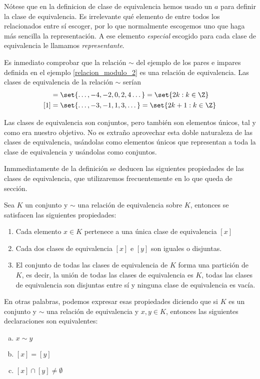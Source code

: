 \documentclass[../algebra_lineal.tex]{subfiles}
\begin{document}
\begin{remark}
    Nótese que en la definicion de clase de equivalencia hemos usado un $a$ para definir la clase de equivalencia. Es irrelevante qué elemento de entre todos los relacionados entre sí escoger, por lo que normalmente escogemos uno que haga más sencilla la representación. A ese elemento \textit{especial} escogido para cada clase de equivalencia le llamamos \textit{representante}.
\end{remark}

\begin{example}
    Es inmediato comprobar que la relación $\sim$ del ejemplo de los pares e impares definida en el ejemplo \ref{relacion_modulo_2} es una relación de equivalencia. Las clases de equivalencia de la relación $\sim$ serían
    \begin{align*}
        [0] &= \set{\dots, -4, -2, 0, 2, 4 \dots} = \set{2k : k \in \Z} \\
        [1] &= \set{\dots, -3, -1, 1, 3, \dots} = \set{2k+1 : k \in \Z}
    \end{align*}  
\end{example}

Las clases de equivalencia son conjuntos, pero también son elementos únicos, tal y como era nuestro objetivo. No es extraño aprovechar esta doble naturaleza de las clases de equivalencia, usándolas como elementos únicos que representan a toda la clase de equivalencia y usándolas como conjuntos.

Inmmediatamente de la definición se deducen las siguientes propiedades de las clases de equivalencia, que utilizaremos frecuentemente en lo que queda de sección.

\begin{corollary}
    \label{propiedades_relacion_equivalencia}
    Sea $K$ un conjunto y $\sim$ una relación de equivalencia sobre $K$, entonces se satisfacen las siguientes propiedades:
    \begin{enumerate}
        \item Cada elemento $x \in K$ pertenece a una única clase de equivalencia $[x]$
        \item Cada dos clases de equivalencia $[x]$ e $[y]$ son iguales o disjuntas.
        \item El conjunto de todas las clases de equivalencia de $K$ forma una partición de $K$, es decir, la unión de todas las clases de equivalencia es $K$, todas las clases de equivalencia son disjuntas entre sí y ninguna clase de equivalencia es vacía.  
    \end{enumerate}
    En otras palabras, podemos expresar esas propiedades diciendo que si $K$ es un conjunto y $\sim$ una relación de equivalencia y $x, y \in K$, entonces las siguientes declaraciones son equivalentes:
    \begin{enumerate}[a)]
        \item $x \sim y$
        \item $[x] = [y]$
        \item $[x] \cap [y] \ne \emptyset$
    \end{enumerate}
\end{corollary}
\end{document}
